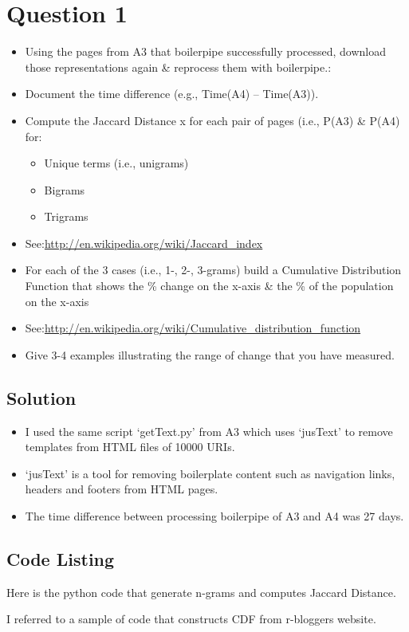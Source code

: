 
\section{Question 1}
\label{part1}

\begin{itemize}
\item Using the pages from A3 that boilerpipe successfully processed, download those representations again \& reprocess them with boilerpipe.:
\item Document the time difference (e.g., Time(A4) – Time(A3)).
\item Compute the Jaccard Distance x for each pair of pages (i.e., P(A3) \& P(A4) for:
 \begin{itemize}
\item Unique terms (i.e., unigrams)
\item Bigrams
\item Trigrams
\end{itemize}
\item See:\url{http://en.wikipedia.org/wiki/Jaccard_index }
\item For each of the 3 cases (i.e., 1-, 2-, 3-grams) build a Cumulative Distribution Function that shows the \% change on the x-axis \& the \% of the population on the x-axis
\item See:\url {http://en.wikipedia.org/wiki/Cumulative_distribution_function}
\item Give 3-4 examples illustrating the range of change that you have measured.
\end{itemize}
\subsection{Solution}

\begin{itemize}
	\item I used the same script `getText.py' from A3 which uses `jusText'\cite{jusText} to remove templates from HTML files of 10000 URIs.
	\item `jusText'\cite{jusText} is a tool for removing boilerplate content such as navigation links, headers and footers from HTML pages.
	\item The time difference between processing boilerpipe of A3 and A4 was 27 days.
\end{itemize}

 \subsection{Code Listing}
Here is the python code that generate n-grams and computes Jaccard Distance.

\newpage 
I referred to a sample of code that constructs CDF from r-bloggers\cite{Cumulative} website.

